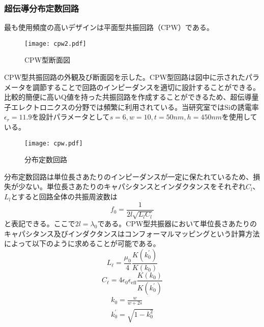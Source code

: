         \subsubsection{超伝導分布定数回路}
            最も使用頻度の高いデザインは平面型共振回路（CPW）である。
            \begin{figure}[H]
                \centering
                \texttt{[image: cpw2.pdf]}
                \caption{CPW型断面図}
            \end{figure}
            CPW型共振回路の外観及び断面図を示した。CPW型回路は図中に示されたパラメータを調節することで回路のインピーダンスを適切に設計することができる。比較的簡便に高いQ値を持った共振回路を作成することができるため、超伝導量子エレクトロニクスの分野では頻繁に利用されている。当研究室ではSiの誘電率$\epsilon_r=11.9$を設計パラメータとして$s=6,w=10,t=50nm,h=450nm$を使用している。
            \begin{figure}[H]
                \centering
                \texttt{[image: cpw.pdf]}
                \caption{分布定数回路}
            \end{figure}
            分布定数回路は単位長さあたりのインピーダンスが一定に保たれているため、損失が少ない。単位長さあたりのキャパシタンスとインダクタンスをそれぞれ$C_l$、$L_l$とすると回路全体の共振周波数は
            \begin{equation}
                f_{0}=\frac{1}{2l\sqrt{L_l C_l}}
                \end{equation}
            と表記できる。ここで$2l=\lambda_0$である\cite*{Goppl2008,Besedin2018,inomata}。CPW型共振器において単位長さあたりのキャパシタンス及びインダクタンスはコンフォーマルマッピングという計算方法によって以下のように求めることが可能である。
            \begin{equation}
                L_{\ell}=\frac{\mu_{0}}{4} \frac{K\left(k_{0}^{\prime}\right)}{K\left(k_{0}\right)}
            \end{equation}
            \begin{equation}
                C_{\ell}=4 \epsilon_{0} \epsilon_{\mathrm{eff}} \frac{K\left(k_{0}\right)}{K\left(k_{0}^{\prime}\right)}
            \end{equation}
            \begin{equation}
                \begin{array}{l}
                k_{0}=\frac{w}{w+2 s} \\
                k_{0}^{\prime}=\sqrt{1-k_{0}^{2}}
                \end{array}
            \end{equation}
